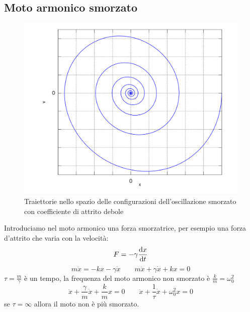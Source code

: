 \subsection{Moto armonico smorzato}
\begin{figure}
 \centering
 \includegraphics[scale=0.6]{immagini/fisica1/oscillatore_smorzato_fase}
 \caption{Traiettorie nello spazio delle configurazioni dell'oscillazione smorzato con coefficiente di attrito debole}
\end{figure}
Introduciamo nel moto armonico una forza smorzatrice, per esempio una forza d'attrito che varia con la velocità:
\begin{equation*}F=-\gamma \frac{\mathrm{d} x}{\mathrm{d} t}\end{equation*}
\begin{equation*}m\ddot x=-kx-\gamma\dot x\qquad m\ddot x+\gamma\dot x+kx=0\end{equation*}
$\tau=\frac{m}{\gamma}$ è un tempo, la frequenza del moto armonico non smorzato è $\frac{k}{m}=\omega_0^2$
\begin{equation*}\ddot x+\frac{\gamma}{m}\dot x+\frac{k}{m}x=0\qquad \ddot x+\frac{1}{\tau}\dot x+\omega_0^2x=0\end{equation*}
se $\tau=\infty$ allora il moto non è più smorzato.

